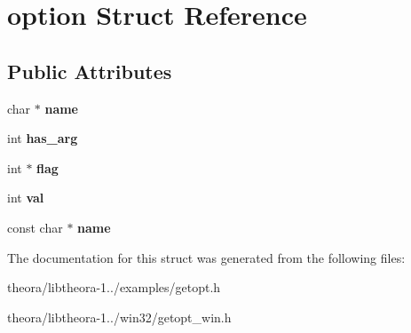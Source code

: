 \hypertarget{structoption}{\section{option Struct Reference}
\label{structoption}
}
\subsection*{Public Attributes}
\begin{DoxyCompactItemize}
\item 
\hypertarget{structoption_aa90e8d0a70f5b7595f2a88d7c6df5a2b}{char $\ast$ {\bfseries name}}\label{structoption_aa90e8d0a70f5b7595f2a88d7c6df5a2b}

\item 
\hypertarget{structoption_a90d7ee9a51eea5c002682dbd0af149e4}{int {\bfseries has\+\_\+arg}}\label{structoption_a90d7ee9a51eea5c002682dbd0af149e4}

\item 
\hypertarget{structoption_a24ad4639d5d498fdc1c5b38bcaabc263}{int $\ast$ {\bfseries flag}}\label{structoption_a24ad4639d5d498fdc1c5b38bcaabc263}

\item 
\hypertarget{structoption_a13bd155ec3b405d29c41ab8d0793be11}{int {\bfseries val}}\label{structoption_a13bd155ec3b405d29c41ab8d0793be11}

\item 
\hypertarget{structoption_adc503659d37af8017fb4b86d61c99086}{const char $\ast$ {\bfseries name}}\label{structoption_adc503659d37af8017fb4b86d61c99086}

\end{DoxyCompactItemize}


The documentation for this struct was generated from the following files\+:\begin{DoxyCompactItemize}
\item 
theora/libtheora-\/1../examples/getopt.\+h\item 
theora/libtheora-\/1../win32/getopt\+\_\+win.\+h\end{DoxyCompactItemize}
